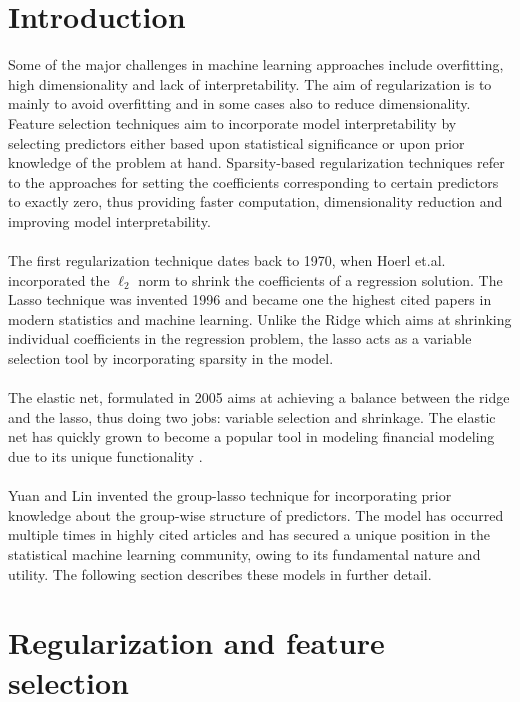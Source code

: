 \documentclass[a4paper,12pt]{article}
\begin{document}
	\section{Introduction}
	Some of the major challenges in machine learning approaches include overfitting, high dimensionality and lack of interpretability. The aim of regularization is to mainly to avoid overfitting and in some cases also to reduce dimensionality. Feature selection techniques aim to incorporate model interpretability by selecting predictors either based upon statistical significance or upon prior knowledge of the problem at hand. Sparsity-based regularization techniques refer to the approaches for setting the coefficients corresponding to certain predictors to exactly zero, thus providing faster computation, dimensionality reduction and improving model interpretability. \\
\\
The first regularization technique dates back to 1970, when Hoerl et.al.\cite{hoerl1970ridge} incorporated the $\ell_2$ norm to shrink the coefficients of a regression solution. 
    The Lasso\cite{tibshirani1996regression} technique was invented 1996 and became one the highest cited papers in modern statistics and machine learning. Unlike the Ridge which aims at shrinking individual coefficients in the regression problem, the lasso acts as a variable selection tool by incorporating sparsity in the model. \\ \\
The elastic net, formulated in 2005 \cite{zou2005regularization} aims at achieving a balance between the ridge and the lasso, thus doing two jobs: variable selection and shrinkage. The elastic net has quickly grown to become a popular tool in modeling financial modeling due to its unique functionality \cite{kim2014forecasting}.\\ \\
Yuan and Lin \cite{yuan2006model} invented the group-lasso technique for incorporating prior knowledge about the group-wise structure of predictors. The model has occurred multiple times in highly cited articles \cite{hastie2009unsupervised,boyd2011distributed} and has secured a unique position in the statistical machine learning community, owing to its fundamental nature and utility. The following section describes these models in further detail.   



\newpage
\section{Regularization and feature selection}
\end{document}
